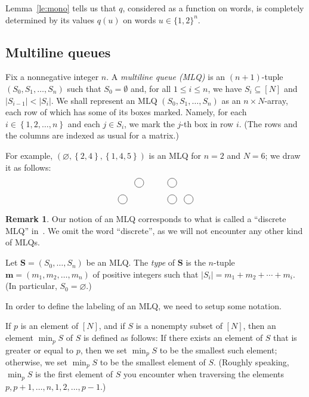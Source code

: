 \documentclass[submission]{FPSAC2018}
\newcommand{\0}{\phantom{c}}
\newcommand{\mm}{\mathbf{m}}
\newcommand{\MLQ}{\mathbf{S}}
\newcommand{\set}[1]{\left\{ #1 \right\}}
\newcommand{\abs}[1]{\left| #1 \right|}
\newcommand{\tup}[1]{\left( #1 \right)}
\newcommand{\ive}[1]{\left[ #1 \right]}
\newcommand{\mlnode}[1]{\node[circle, draw=black] at (#1){\phantom{c}};}
\newcommand{\defn}[1]{{\color{darkred}\emph{#1}}} %
\theoremstyle{plain}
\theoremstyle{definition}
\newtheorem{dfn}[thm]{Definition}
\newtheorem{remark}[thm]{Remark}
\numberwithin{equation}{section}
\begin{document}
Lemma~\ref{le:mono} tells us that $q$, considered as a function on words, is completely determined by its values $q(u)$ on words $u\in\{1,2\}^n$.

\subsection{Multiline queues}

Fix a nonnegative integer $n$.
A \defn{multiline queue (MLQ)} is an $(n+1)$-tuple $(S_0, S_1, \dotsc, S_n)$ such that $S_0 = \emptyset$ and, for all $1 \leq i \leq n$, we have $S_i \subseteq \ive{N}$ and $\lvert S_{i-1} \rvert < \lvert S_i \rvert$.
We shall represent an MLQ $\tup{S_0, S_1, \ldots, S_n}$ as an
$n \times N$-array, each row of which has some of its boxes
marked. Namely, for each $i \in \set{1, 2, \ldots, n}$ and
each $j \in S_i$, we mark the $j$-th box in row $i$.
(The rows and the columns are indexed as usual for a matrix.)

For example, $\tup{\varnothing, \set{2, 4}, \set{1, 4, 5}}$
is an MLQ for $n = 2$ and $N = 6$; we draw it as follows:
\[
\begin{tikzpicture}[scale=0.7, every node/.style={scale=0.7}]
  \mlnode{2, 2}
  \mlnode{4, 2}
  \mlnode{1, 1}
  \mlnode{4, 1}
  \mlnode{5, 1}
\end{tikzpicture}
\]

\begin{remark}
Our notion of an MLQ corresponds to what is called a ``discrete MLQ'' in~\cite[\S 2.2]{AasLin17}.
We omit the word ``discrete'', as we will not encounter any other kind of MLQs.
\end{remark}

Let $\MLQ = (S_0, \dotsc, S_n)$ be an MLQ.
The \defn{type} of $\MLQ$ is the  $n$-tuple $\mm = \tup{m_1, m_2, \ldots, m_n}$ of
positive
integers such that $\abs{S_i} = m_1 + m_2 + \cdots + m_i$.
(In particular, $S_0 = \varnothing$.)

In order to define the labeling of an MLQ, we need to setup some notation.

If $p$ is an element of $\ive{N}$,
and if $S$ is a nonempty subset of $\ive{N}$,
then an element $\min_p S$ of $S$ is defined as follows:
If there exists an element of $S$ that is greater
or equal to $p$, then we set $\min_p S$ to be the
smallest such element;
otherwise, we set $\min_p S$ to be the smallest
element of $S$.
(Roughly speaking, $\min_p S$ is the first element
of $S$ you encounter when traversing the elements
$p, p+1, \ldots, n, 1, 2, \ldots, p-1$.)
\end{document}
